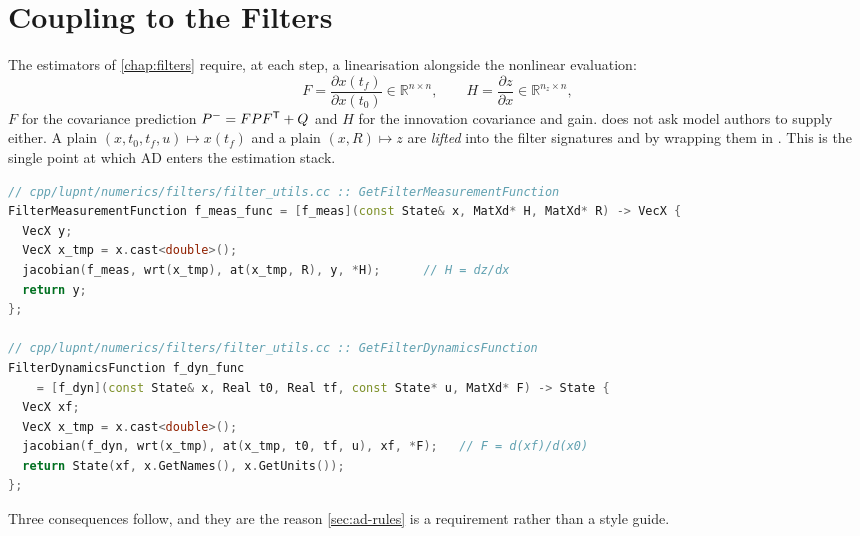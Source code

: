 \section{Coupling to the Filters}
\label{sec:ad-filters}

The estimators of \cref{chap:filters} require, at each step, a linearisation
alongside the nonlinear evaluation:
\begin{equation}
  \label{eq:ad-fh}
  F = \frac{\partial x(t_f)}{\partial x(t_0)} \in \mathbb{R}^{n\times n},
  \qquad
  H = \frac{\partial z}{\partial x} \in \mathbb{R}^{n_z \times n},
\end{equation}
$F$ for the covariance prediction $P^- = F P F^{\mathsf{T}} + Q$ and $H$ for the
innovation covariance and gain. \lupnt{} does not ask model authors to supply
either. A plain  $(x, t_0, t_f, u) \mapsto x(t_f)$ and a
plain  $(x, R) \mapsto z$ are \emph{lifted} into the
filter signatures  and
 by wrapping them in . This is
the single point at which AD enters the estimation stack.

\begin{lstlisting}[language=cpp, caption={Lifting plain models into filter callbacks. Source: \code{cpp/lupnt/numerics/filters/filter\_utils.cc}}, label={lst:ad-filter}]
// cpp/lupnt/numerics/filters/filter_utils.cc :: GetFilterMeasurementFunction
FilterMeasurementFunction f_meas_func = [f_meas](const State& x, MatXd* H, MatXd* R) -> VecX {
  VecX y;
  VecX x_tmp = x.cast<double>();
  jacobian(f_meas, wrt(x_tmp), at(x_tmp, R), y, *H);      // H = dz/dx
  return y;
};

// cpp/lupnt/numerics/filters/filter_utils.cc :: GetFilterDynamicsFunction
FilterDynamicsFunction f_dyn_func
    = [f_dyn](const State& x, Real t0, Real tf, const State* u, MatXd* F) -> State {
  VecX xf;
  VecX x_tmp = x.cast<double>();
  jacobian(f_dyn, wrt(x_tmp), at(x_tmp, t0, tf, u), xf, *F);   // F = d(xf)/d(x0)
  return State(xf, x.GetNames(), x.GetUnits());
};
\end{lstlisting}

Three consequences follow, and they are the reason \cref{sec:ad-rules} is a
requirement rather than a style guide.

